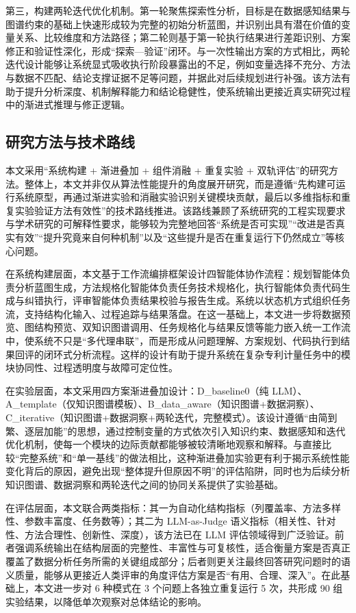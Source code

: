 第三，构建两轮迭代优化机制。第一轮聚焦探索性分析，目标是在数据感知结果与图谱约束的基础上快速形成较为完整的初始分析蓝图，并识别出具有潜在价值的变量关系、比较维度和方法路径；第二轮则基于第一轮执行结果进行差距识别、方案修正和验证性深化，形成“探索—验证”闭环。与一次性输出方案的方式相比，两轮迭代设计能够让系统显式吸收执行阶段暴露出的不足，例如变量选择不充分、方法与数据不匹配、结论支撑证据不足等问题，并据此对后续规划进行补强。该方法有助于提升分析深度、机制解释能力和结论稳健性，使系统输出更接近真实研究过程中的渐进式推理与修正逻辑。

\subsection{研究方法与技术路线}

本文采用“系统构建 + 渐进叠加 + 组件消融 + 重复实验 + 双轨评估”的研究方法。整体上，本文并非仅从算法性能提升的角度展开研究，而是遵循“先构建可运行系统原型，再通过渐进实验和消融实验识别关键模块贡献，最后以多维指标和重复实验验证方法有效性”的技术路线推进。该路线兼顾了系统研究的工程实现要求与学术研究的可解释性要求，能够较为完整地回答“系统是否可实现”“改进是否真实有效”“提升究竟来自何种机制”以及“这些提升是否在重复运行下仍然成立”等核心问题。

在系统构建层面，本文基于工作流编排框架\cite{langgraph2024}设计四智能体协作流程：规划智能体负责分析蓝图生成，方法规格化智能体负责任务技术规格化，执行智能体负责代码生成与纠错执行，评审智能体负责结果校验与报告生成。系统以状态机方式组织任务流，支持结构化输入、过程追踪与结果落盘。在这一基础上，本文进一步将数据预览、图结构预览、双知识图谱调用、任务规格化与结果反馈等能力嵌入统一工作流中，使系统不只是“多代理串联”，而是形成从问题理解、方案规划、代码执行到结果回评的闭环式分析流程。这样的设计有助于提升系统在复杂专利计量任务中的模块协同性、过程透明度与故障可定位性。

在实验层面，本文采用四方案渐进叠加设计：D\_baseline0（纯 LLM）、A\_template（仅知识图谱模板）、B\_data\_aware（知识图谱+数据洞察）、C\_iterative（知识图谱+数据洞察+两轮迭代，完整模式）。该设计遵循“由简到繁、逐层加能”的思想，通过控制变量的方式依次引入知识约束、数据感知和迭代优化机制，使每一个模块的边际贡献都能够被较清晰地观察和解释。与直接比较“完整系统”和“单一基线”的做法相比，这种渐进叠加实验更有利于揭示系统性能变化背后的原因，避免出现“整体提升但原因不明”的评估陷阱，同时也为后续分析知识图谱、数据洞察和两轮迭代之间的协同关系提供了实验基础。

在评估层面，本文联合两类指标：其一为自动化结构指标（列覆盖率、方法多样性、参数丰富度、任务数等）；其二为 LLM-as-Judge 语义指标（相关性、针对性、方法合理性、创新性、深度），该方法已在 LLM 评估领域得到广泛验证\cite{zheng2023judging}。前者强调系统输出在结构层面的完整性、丰富性与可复核性，适合衡量方案是否真正覆盖了数据分析任务所需的关键组成部分；后者则更关注最终回答研究问题时的语义质量，能够从更接近人类评审的角度评估方案是否“有用、合理、深入”。在此基础上，本文进一步对 6 种模式在 3 个问题上各独立重复运行 5 次，共形成 90 组实验结果，以降低单次观察对总体结论的影响。

